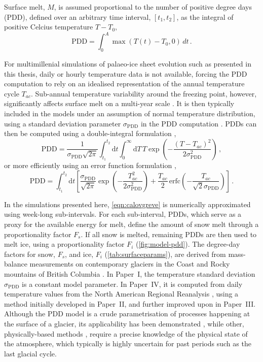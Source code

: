 \documentclass{article}
\newcommand{\PDD}[0]{\mathrm{PDD}}
\newcommand{\sPDD}[0]{\sigma_{\mathrm{PDD}}}
\newcommand{\CCLI}[0]{Paper~I}      %
\newcommand{\PSDV}[0]{Paper~II}     %
\newcommand{\PSDP}[0]{Paper~III}    %
\newcommand{\CCYC}[0]{Paper~IV}     %
\begin{document}
Surface melt, $M$, is assumed proportional to the number of positive degree
days (PDD), defined over an arbitrary time interval, $[t_1, t_2]$, as the
integral of positive Celcius temperature $T-T_0$,
\begin{equation}
    \mathrm{PDD} = \int_{0}^{A}\max(T(t)-T_0,0)\,dt \,.
\end{equation}

For multimillenial simulations of palaeo-ice sheet evolution such as
presented in this thesis, daily or hourly temperature data is not available,
forcing the PDD computation to rely on an idealised representation of the
annual temperature cycle $T_{ac}$. Sub-annual temperature variability around
the freezing point, however, significantly affects surface melt on a multi-year
scale \citep{Arnold.Mackay.1964}. It is then typically included in the models
under an assumption of normal temperature distribution, using a standard
deviation parameter $\sPDD$ in the PDD computation \citep{Braithwaite.1984}.
PDDs can then be computed using a double-integral formulation
\citep{Reeh.1991},
\begin{equation}
    \PDD = \frac{1}{\sPDD\sqrt{2\pi}}
        \int_{t_1}^{t_2} \mathrm{d}t
        \int_{0}^{\infty} \mathrm{d}T \,
        T \exp\left({-\frac{(T-T_{ac})^2}{2\sPDD^2}}\right) \,,
\end{equation}
or more efficiently using an error function formulation
\citep{Calov.Greve.2005},
\begin{equation}
    \label{eqn:calovgreve}
    \PDD = \int_{t_1}^{t_2} \mathrm{d}t
        \left[\frac{\sPDD}{\sqrt{2\pi}}
                \exp\left({-\frac{T_{ac}^2}{2\sPDD^2}}\right)
              + \frac{T_{ac}}{2} \, \mathrm{erfc}
                \left(-\frac{T_{ac}}{\sqrt{2}\sPDD}\right)\right] \,.
\end{equation}

In the simulations presented here, \cref{eqn:calovgreve} is numerically
approximated using week-long sub-intervals. For each sub-interval, PDDs, which
serve as a proxy for the available energy for melt, define the amount of snow
melt through a proportionality factor $F_s$. If all snow is melted, remaining
PDDs are then used to melt ice, using a proportionality factor $F_i$
(\cref{fig:model-pdd}). The degree-day factors for snow, $F_s$, and ice, $F_i$
(\cref{tab:surfaceparams}),
are derived from mass-balance measurements on contemporary glaciers in the
Coast and Rocky mountains of British Columbia \citep{Shea.etal.2009}. In
{\CCLI}, the temperature standard deviation $\sPDD$ is a constant model
parameter. In {\CCYC}, it is computed from daily temperature values from the
North American Regional Reanalysis \citep[NARR,][]{Mesinger.etal.2006}, using
a method initially developed in {\PSDV}, and further improved upon in {\PSDP}.
Although the PDD model is a crude parametrisation of processes happening at the
surface of a glacier, its applicability has been demonstrated
\citep[e.g.][]{Hock.2003},
while other, physically-based methods \citep[e.g.][]{Hock.2005}, require a
precise knowledge of the physical state of the atmosphere, which typically is highly
uncertain for past periods such as the last glacial cycle.
\end{document}
